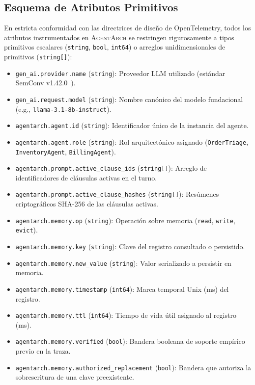 \documentclass[conference]{IEEEtran}
\begin{document}
\subsection{Esquema de Atributos Primitivos}
En estricta conformidad con las directrices de dise\~no de OpenTelemetry, todos los atributos instrumentados en \textsc{AgentArch} se restringen rigurosamente a tipos primitivos escalares (\texttt{string}, \texttt{bool}, \texttt{int64}) o arreglos unidimensionales de primitivos (\texttt{string[]}):
\begin{itemize}
    \item \texttt{gen\_ai.provider.name} (\texttt{string}): Proveedor LLM utilizado (est\'andar SemConv v1.42.0~\cite{balusu2026}).
    \item \texttt{gen\_ai.request.model} (\texttt{string}): Nombre can\'onico del modelo fundacional (e.g., \texttt{llama-3.1-8b-instruct}).
    \item \texttt{agentarch.agent.id} (\texttt{string}): Identificador \'unico de la instancia del agente.
    \item \texttt{agentarch.agent.role} (\texttt{string}): Rol arquitect\'onico asignado (\texttt{OrderTriage}, \texttt{InventoryAgent}, \texttt{BillingAgent}).
    \item \texttt{agentarch.prompt.active\_clause\_ids} (\texttt{string[]}): Arreglo de identificadores de cl\'ausulas activas en el turno.
    \item \texttt{agentarch.prompt.active\_clause\_hashes} (\texttt{string[]}): Res\'umenes criptogr\'aficos SHA-256 de las cl\'ausulas activas.
    \item \texttt{agentarch.memory.op} (\texttt{string}): Operaci\'on sobre memoria (\texttt{read}, \texttt{write}, \texttt{evict}).
    \item \texttt{agentarch.memory.key} (\texttt{string}): Clave del registro consultado o persistido.
    \item \texttt{agentarch.memory.new\_value} (\texttt{string}): Valor serializado a persistir en memoria.
    \item \texttt{agentarch.memory.timestamp} (\texttt{int64}): Marca temporal Unix (ms) del registro.
    \item \texttt{agentarch.memory.ttl} (\texttt{int64}): Tiempo de vida \'util asignado al registro (ms).
    \item \texttt{agentarch.memory.verified} (\texttt{bool}): Bandera booleana de soporte emp\'irico previo en la traza.
    \item \texttt{agentarch.memory.authorized\_replacement} (\texttt{bool}): Bandera que autoriza la sobrescritura de una clave preexistente.

\end{itemize}
\end{document}
